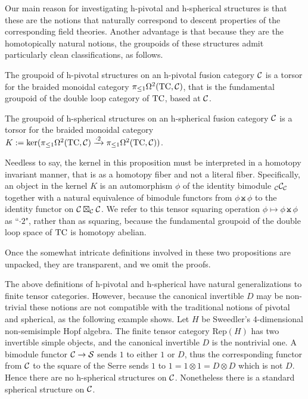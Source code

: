 \documentclass{amsart}
\begin{document}
Our main reason for investigating h-pivotal and h-spherical structures is that these are the notions that naturally correspond to descent properties of the corresponding field theories.  Another advantage is that because they are the homotopically natural notions, the groupoids of these structures admit particularly clean classifications, as follows.

\begin{proposition}
The groupoid of h-pivotal structures on an h-pivotal fusion category $\mathcal C$ is a torsor for the braided monoidal category $\pi_{\leq 1} \Omega^2(\mathrm{TC},\mathcal C)$, that is the fundamental groupoid of the double loop category of $\mathrm{TC}$, based at $\mathcal C$.
\end{proposition}

\begin{proposition}
The groupoid of h-spherical structures on an h-spherical fusion category $\mathcal C$ is a torsor for the braided monoidal category $K := \ker(\pi_{\leq 1} \Omega^2(\mathrm{TC},\mathcal C) \xrightarrow{\cdot 2} \pi_{\leq 1} \Omega^2(\mathrm{TC},\mathcal C))$.
\end{proposition}

Needless to say, the kernel in this proposition must be interpreted in a homotopy invariant manner, that is as a homotopy fiber and not a literal fiber.  Specifically, an object in the kernel $K$ is an automorphism $\phi$ of the identity bimodule ${}_{\mathcal C} {\mathcal C}_{\mathcal C}$ together with a natural equivalence of bimodule functors from $\phi \btimes \phi$ to the identity functor on $\mathcal C \boxtimes_{\mathcal C} \mathcal C$.  We refer to this tensor squaring operation $\phi \mapsto \phi \btimes \phi$ as ``$\cdot 2$", rather than as squaring, because the fundamental groupoid of the double loop space of $\mathrm{TC}$ is homotopy abelian.

Once the somewhat intricate definitions involved in these two propositions are unpacked, they are transparent, and we omit the proofs. 

\begin{warning}
The above definitions of h-pivotal and h-spherical have natural generalizations to finite tensor categories.  However, because the canonical invertible $D$ may be non-trivial these notions are not compatible with the traditional notions of pivotal and spherical, as the following example shows.  Let $H$ be Sweedler's $4$-dimensional non-semisimple Hopf algebra.  The finite tensor category $\mathrm{Rep}(H)$ has two invertible simple objects, and the canonical invertible $D$ is the nontrivial one.  A bimodule functor $\mathcal C \rightarrow \mathcal S$ sends $1$ to either $1$ or $D$, thus the corresponding functor from $\mathcal C$ to the square of the Serre sends $1$ to $1 = 1 \otimes 1 = D \otimes D$ which is not $D$.  Hence there are no h-spherical structures on $\mathcal C$.  Nonetheless there is a standard spherical structure on $\mathcal C$.
\end{warning}
\end{document}

